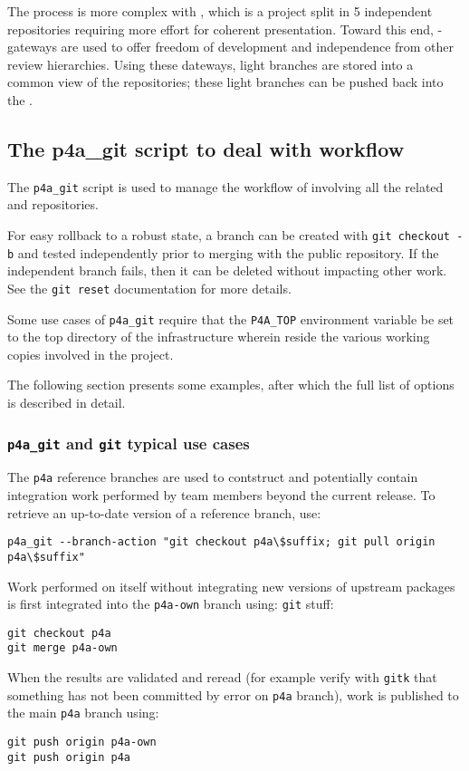 \documentclass[a4paper]{article}
\begin{document}
The process is more complex with \Apips, which is a project split in 5
independent \Asvn repositories requiring more effort for coherent presentation.
Toward this end, \Asvn-\Agit gateways are used to offer freedom of
development and independence from other review hierarchies. Using
these dateways, light
branches are stored into a common \Agit view of the \Apips{} \Asvn
repositories; these light branches can be pushed back into the \Apips{} \Asvn.

\subsection{The p4a\_git script to deal with workflow}
\label{sec:p4a_git-script-deal}

The \verb|p4a_git| script is used to manage the workflow of \Apfa
involving all the related \Agit and \Asvn repositories.

For easy rollback to a robust state, a branch can be created with
\texttt{git checkout -b} and tested independently prior to merging
with the public repository. If the independent branch fails, then it
can be deleted without impacting other work.
See the \texttt{git reset} documentation for more details.

Some use cases of \verb|p4a_git| require that the \verb|P4A_TOP|
environment variable be set to the top directory of the \Apfa
infrastructure wherein reside the various \Agit working copies involved in the
project.

The following section presents some examples, after which the full
list of options is described in detail.

\subsubsection{\protect\texttt{p4a\_git} and \protect\texttt{git} typical use cases}
\label{sec:p4a_git-typical-use}

The \Apfa \texttt{p4a} reference branches are used to contstruct \Apfa
and potentially contain integration work performed by \Apfa team
members beyond the current release. To retrieve an up-to-date version
of a reference branch, use:
\begin{verbatim}
p4a_git --branch-action "git checkout p4a\$suffix; git pull origin p4a\$suffix"
\end{verbatim}

Work performed on \Apfa itself without integrating new versions of upstream
packages is first integrated into the \texttt{p4a-own} branch using:
\texttt{git} stuff:
\begin{verbatim}
git checkout p4a
git merge p4a-own
\end{verbatim}
When the results are validated and reread (for example verify with
\texttt{gitk} that something has not been committed by error on
\texttt{p4a} branch), work is published to the main \texttt{p4a} branch
using:
\begin{verbatim}
git push origin p4a-own
git push origin p4a
\end{verbatim}
\end{document}
